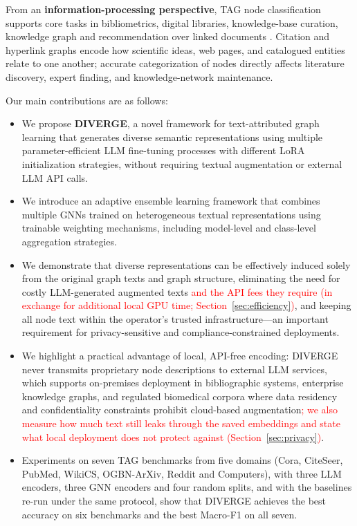 \documentclass[a4paper,fleqn]{cas-sc}
\newcommand{\revone}[1]{\textcolor{red}{#1}}   %
\DeclareRobustCommand{\revcommon}[2][]{\textcolor{revshared}{#2}} %
\begin{document}
From an \textbf{information-processing perspective}, TAG node classification supports core tasks in bibliometrics, digital libraries, knowledge-base curation, knowledge graph and recommendation over linked documents \citep{Zhang2024TAGSurvey, RAMIREZMOLINA2026104842, WANG2026DGRLS}. Citation and hyperlink graphs encode how scientific ideas, web pages, and catalogued entities relate to one another; accurate categorization of nodes directly affects literature discovery, expert finding, and knowledge-network maintenance.

Our main contributions are as follows:
\begin{itemize}
	\item We propose \textbf{DIVERGE}, a novel framework for text-attributed graph learning that generates diverse semantic representations using multiple parameter-efficient LLM fine-tuning processes with different LoRA initialization strategies, without requiring textual augmentation or external LLM API calls.
	
	\item We introduce an adaptive ensemble learning framework that combines multiple GNNs trained on heterogeneous textual representations using trainable weighting mechanisms, including model-level and class-level aggregation strategies.
	
	\item We demonstrate that diverse representations can be effectively induced solely from the original graph texts and graph structure, eliminating the need for costly LLM-generated augmented texts \revone{and the API fees they require (in exchange for additional local GPU time; Section~\ref{sec:efficiency})}, and keeping all node text within the operator's trusted infrastructure---an important requirement for privacy-sensitive and compliance-constrained deployments.
\item We highlight a practical advantage of local, API-free encoding: DIVERGE never transmits proprietary node descriptions to external LLM services, which supports on-premises deployment in bibliographic systems, enterprise knowledge graphs, and regulated biomedical corpora where data residency and confidentiality constraints prohibit cloud-based augmentation\revone{; we also measure how much text still leaks through the saved embeddings and state what local deployment does not protect against (Section~\ref{sec:privacy})}.
	
	\item \revcommon[R1,R2,R4]{Experiments on seven TAG benchmarks from five domains (Cora, CiteSeer, PubMed, WikiCS, OGBN-ArXiv, Reddit and Computers), with three LLM encoders, three GNN encoders and four random splits, and with the baselines re-run under the same protocol, show that DIVERGE achieves the best accuracy on six benchmarks and the best Macro-F1 on all seven.}


\end{itemize}
\end{document}
